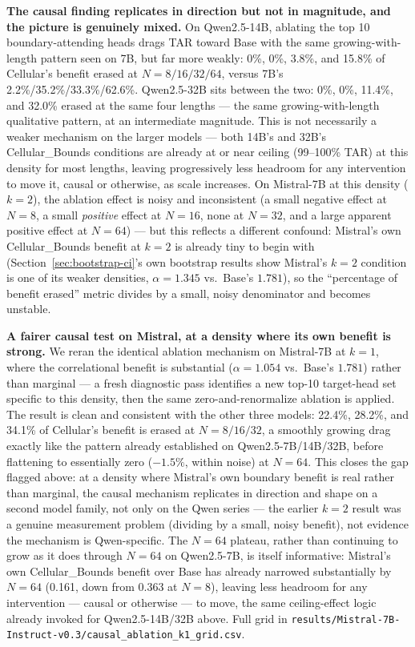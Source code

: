\documentclass[11pt]{article}
\begin{document}
\textbf{The causal finding replicates in direction but not in magnitude, and the picture is genuinely mixed.} On Qwen2.5-14B, ablating the top 10 boundary-attending heads drags TAR toward Base with the same growing-with-length pattern seen on 7B, but far more weakly: 0\%, 0\%, 3.8\%, and 15.8\% of Cellular's benefit erased at $N=8/16/32/64$, versus 7B's 2.2\%/35.2\%/33.3\%/62.6\%. Qwen2.5-32B sits between the two: 0\%, 0\%, 11.4\%, and 32.0\% erased at the same four lengths --- the same growing-with-length qualitative pattern, at an intermediate magnitude. This is not necessarily a weaker mechanism on the larger models --- both 14B's and 32B's Cellular\_Bounds conditions are already at or near ceiling (99--100\% TAR) at this density for most lengths, leaving progressively less headroom for any intervention to move it, causal or otherwise, as scale increases. On Mistral-7B at this density ($k=2$), the ablation effect is noisy and inconsistent (a small negative effect at $N=8$, a small \emph{positive} effect at $N=16$, none at $N=32$, and a large apparent positive effect at $N=64$) --- but this reflects a different confound: Mistral's own Cellular\_Bounds benefit at $k=2$ is already tiny to begin with (Section~\ref{sec:bootstrap-ci}'s own bootstrap results show Mistral's $k=2$ condition is one of its weaker densities, $\alpha=1.345$ vs.\ Base's $1.781$), so the ``percentage of benefit erased'' metric divides by a small, noisy denominator and becomes unstable.

\textbf{A fairer causal test on Mistral, at a density where its own benefit is strong.} We reran the identical ablation mechanism on Mistral-7B at $k=1$, where the correlational benefit is substantial ($\alpha=1.054$ vs.\ Base's $1.781$) rather than marginal --- a fresh diagnostic pass identifies a new top-10 target-head set specific to this density, then the same zero-and-renormalize ablation is applied. The result is clean and consistent with the other three models: 22.4\%, 28.2\%, and 34.1\% of Cellular's benefit is erased at $N=8/16/32$, a smoothly growing drag exactly like the pattern already established on Qwen2.5-7B/14B/32B, before flattening to essentially zero ($-1.5\%$, within noise) at $N=64$. This closes the gap flagged above: at a density where Mistral's own boundary benefit is real rather than marginal, the causal mechanism replicates in direction and shape on a second model family, not only on the Qwen series --- the earlier $k=2$ result was a genuine measurement problem (dividing by a small, noisy benefit), not evidence the mechanism is Qwen-specific. The $N=64$ plateau, rather than continuing to grow as it does through $N=64$ on Qwen2.5-7B, is itself informative: Mistral's own Cellular\_Bounds benefit over Base has already narrowed substantially by $N=64$ (0.161, down from 0.363 at $N=8$), leaving less headroom for any intervention --- causal or otherwise --- to move, the same ceiling-effect logic already invoked for Qwen2.5-14B/32B above. Full grid in \texttt{results/Mistral-7B-Instruct-v0.3/causal\_ablation\_k1\_grid.csv}.
\end{document}
